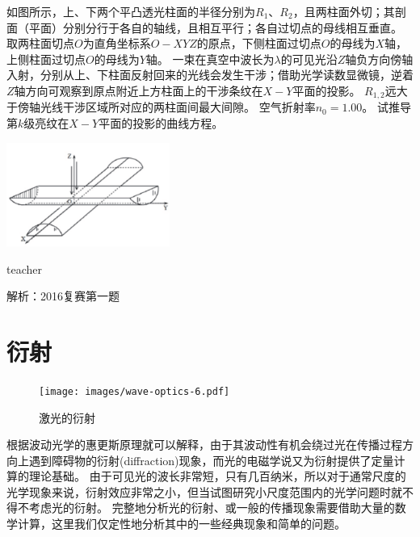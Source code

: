 \begin{example}
	如图所示，上、下两个平凸透光柱面的半径分别为$R_1$、$R_2$，且两柱面外切；其剖面（平面）分别分行于各自的轴线，且相互平行；各自过切点的母线相互垂直。
	取两柱面切点$O$为直角坐标系$O-XYZ$的原点，下侧柱面过切点$O$的母线为$X$轴，上侧柱面过切点$O$的母线为$Y$轴。
	一束在真空中波长为$\lambda$的可见光沿$Z$轴负方向傍轴入射，分别从上、下柱面反射回来的光线会发生干涉；借助光学读数显微镜，逆着$Z$轴方向可观察到原点附近上方柱面上的干涉条纹在$X-Y$平面的投影。
	$R_{1,2}$远大于傍轴光线干涉区域所对应的两柱面间最大间隙。
	空气折射率$n_0=1.00$。
	试推导第$k$级亮纹在$X-Y$平面的投影的曲线方程。
			\begin{flushright}
				\includegraphics[width = 0.4\textwidth]{images/wave-optics-11.pdf} 
			\end{flushright}
	\begin{taggedblock}{teacher}
		
		解析：2016复赛第一题
	\end{taggedblock}
\end{example}%



\section{衍射}
 \begin{figure}
 \texttt{[image: images/wave-optics-6.pdf]} 
 \caption{激光的衍射}
 \end{figure}
根据波动光学的惠更斯原理就可以解释，由于其波动性有机会绕过光在传播过程方向上遇到障碍物的{\heiti 衍射}(diffraction)现象，而光的电磁学说又为衍射提供了定量计算的理论基础。
由于可见光的波长非常短，只有几百纳米，所以对于通常尺度的光学现象来说，衍射效应非常之小，但当试图研究小尺度范围内的光学问题时就不得不考虑光的衍射。
完整地分析光的衍射、或一般的传播现象需要借助大量的数学计算，这里我们仅定性地分析其中的一些经典现象和简单的问题。


